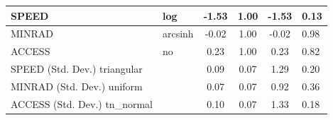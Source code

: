 \begin{table}
\begin{center}
\begin{tabular}{|l|l|c|c|c|l|}
			\hline
			SPEED & log & -1.53 & 1.00 & -1.53 & 0.13 \\
			\hline
			MINRAD & arcsinh & -0.02 & 1.00 & -0.02 & 0.98 \\
			\hline
			ACCESS & no & 0.23 & 1.00 & 0.23 & 0.82 \\
			\hline
			SPEED (Std. Dev.) triangular &  & 0.09 & 0.07 & 1.29 & 0.20 \\
			\hline
			MINRAD (Std. Dev.) uniform &  & 0.07 & 0.07 & 0.92 & 0.36 \\
			\hline
			ACCESS (Std. Dev.) tn_normal &  & 0.10 & 0.07 & 1.33 & 0.18 \\
			\hline
		\end{tabular}
	\end{center}
\end{table}
